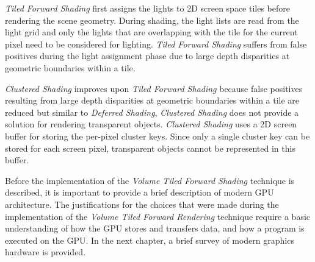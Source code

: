 \emph{Tiled Forward Shading} first assigns the lights to 2D screen space tiles before rendering the scene geometry. During shading, the light lists are read from the light grid and only the lights that are overlapping with the tile for the current pixel need to be considered for lighting. \emph{Tiled Forward Shading} suffers from false positives during the light assignment phase due to large depth disparities at geometric boundaries within a tile.

\emph{Clustered Shading} improves upon \emph{Tiled Forward Shading} because false positives resulting from large depth disparities at geometric boundaries within a tile are reduced but similar to \emph{Deferred Shading}, \emph{Clustered Shading} does not provide a solution for rendering transparent objects. \emph{Clustered Shading} uses a 2D screen buffer for storing the per-pixel cluster keys. Since only a single cluster key can be stored for each screen pixel, transparent objects cannot be represented in this buffer.

Before the implementation of the \emph{Volume Tiled Forward Shading} technique is described, it is important to provide a brief description of modern GPU architecture. The justifications for the choices that were made during the implementation of the \emph{Volume Tiled Forward Rendering} technique require a basic understanding of how the GPU stores and transfers data, and how a program is executed on the GPU. In the next chapter, a brief survey of modern graphics hardware is provided.
